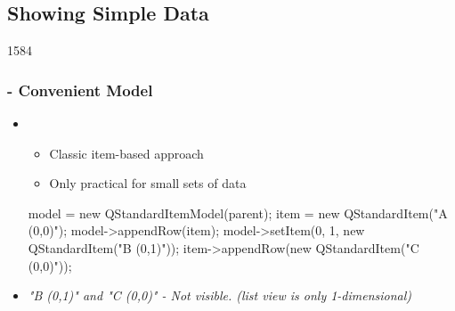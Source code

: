 %
%
%
%

\subsection{Showing Simple Data}


\begin{slide}[fragile]{1584}\frametitle{ -
    Convenient Model}
  \begin{itemize}
  \item {}
    \begin{itemize}
   \item Classic item-based approach
    \item Only practical for small sets of data
 \end{itemize}
   \begin{cpp}
model = new QStandardItemModel(parent);
item = new QStandardItem("A (0,0)");
model->appendRow(item);
model->setItem(0, 1, new QStandardItem("B (0,1)"));
item->appendRow(new QStandardItem("C (0,0)"));
\end{cpp}
\item \textit{"B (0,1)" and "C (0,0)" - Not visible. (list view is only 1-dimensional)}
\end{itemize}
\end{slide}

